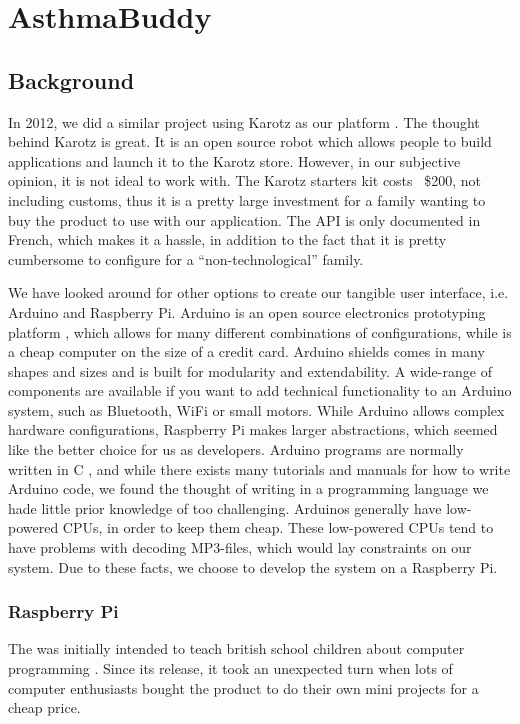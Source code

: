 
\chapter{AsthmaBuddy}
\label{chp:our-solution}

\section{Background}
In 2012, we did a similar project using Karotz  as our platform \cite{CustomerDriven}. The thought behind Karotz is great. It is an open source robot which allows people to build applications and launch it to the Karotz store. However, in our subjective opinion, it is not ideal to work with. The Karotz starters kit costs ~\$200, not including customs, thus it is a pretty large investment for a family wanting to buy the product to use with our application. The API is only documented in French, which makes it a hassle, in addition to the fact that it is pretty cumbersome to configure for a ``non-technological'' family. 


We have looked around for other options to create our tangible user interface, i.e. Arduino and Raspberry Pi. Arduino is an open source electronics prototyping platform \cite{arduino}, which allows for many different combinations of configurations, while \rpi{} is a cheap computer on the size of a credit card. Arduino shields comes in many shapes and sizes and is built for modularity and extendability. A wide-range of components are available if you want to add technical functionality to an Arduino system, such as Bluetooth, WiFi or small motors. 
While Arduino allows complex hardware configurations, Raspberry Pi makes larger abstractions, which seemed like the better choice for us as developers. Arduino programs are normally written in C \cite{strahl2000language}, and while there exists many tutorials and manuals for how to write Arduino code, we found the thought of writing in a programming language we hade little prior knowledge of too challenging. Arduinos generally have low-powered CPUs, in order to keep them cheap. These low-powered CPUs tend to have problems with decoding MP3-files, which would lay constraints on our system. Due to these facts, we choose to develop the system on a Raspberry Pi.


\subsection{Raspberry Pi}
The \rpi{} was initially intended to teach british school children about computer programming \cite{rasperrypi-about}. Since its release, it took an unexpected turn when lots of computer enthusiasts bought the product to do their own mini projects for a cheap price. 

